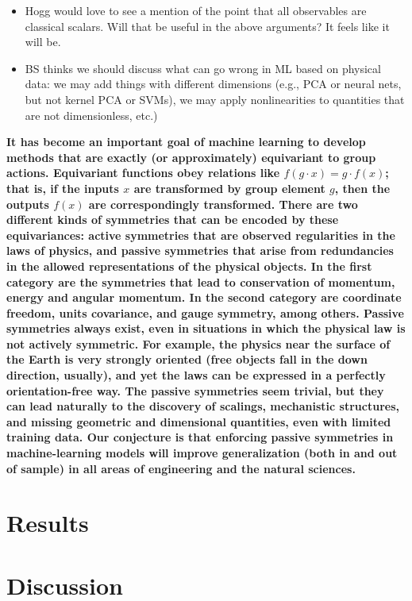 \documentclass[11pt]{article}
\begin{document}
\begin{itemize}
  \item Hogg would love to see a mention of the point that all observables are classical scalars. Will that be useful in the above arguments? It feels like it will be.
  \item BS thinks we should discuss what can go wrong in ML based on physical data: we may add things with different dimensions (e.g., PCA or neural nets, but not kernel PCA or SVMs), we may apply nonlinearities to quantities that are not dimensionless, etc.)
\end{itemize}

{\bfseries\noindent
It has become an important goal of machine learning to develop methods that are exactly (or approximately) equivariant to group actions.
Equivariant functions obey relations like $f(g\cdot x) = g\cdot f(x)$; that is, if the inputs $x$ are transformed by group element $g$, then the outputs $f(x)$ are correspondingly transformed.
There are two different kinds of symmetries that can be encoded by these equivariances: active symmetries that are observed regularities in the laws of physics, and passive symmetries that arise from redundancies in the allowed representations of the physical objects. 
In the first category are the symmetries that lead to conservation of momentum, energy and angular momentum. In the second category are coordinate freedom, units covariance, and gauge symmetry, among others.  
Passive symmetries always exist, even in situations in which the physical law is not actively symmetric.
For example, the physics near the surface of the Earth is very strongly oriented (free objects fall in the down direction, usually), and yet the laws can be expressed in a perfectly orientation-free way.
The passive symmetries seem trivial, but they can lead naturally to the discovery of scalings, mechanistic structures, and missing geometric and dimensional quantities, even with limited training data.
Our conjecture is that enforcing passive symmetries in machine-learning models will improve generalization (both in and out of sample) in all areas of engineering and the natural sciences.}

\bigskip\noindent

\section*{Results}


\section*{Discussion}
\end{document}
